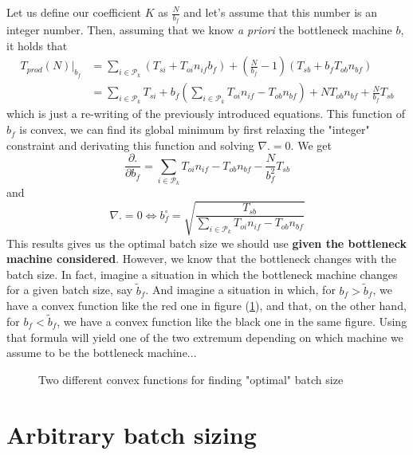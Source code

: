 Let us define our coefficient $K$ as $\frac{N}{b_f}$ and let's assume that this number is an integer number. Then, assuming that we know \textit{a priori} the bottleneck machine $b$, it holds that \[ \begin{split}
    T_{prod}(N)|_{b_f} &= \sum_{i\in\mathcal P_k} ( T_{si} + T_{oi}n_{if}b_f ) + \left( \frac{N}{b_f} - 1 \right)(T_{sb} + b_fT_{ob}n_{bf})\\
    &= \sum_{i\in\mathcal P_k} T_{si} + b_f\left( \sum_{i\in\mathcal P_k} T_{oi}n_{if} - T_{ob}n_{bf} \right) + NT_{ob}n_{bf} + \frac{N}{b_f}T_{sb}
    \end{split}
\] which is just a re-writing of the previously introduced equations. This function of $b_f$ is convex, we can find its global minimum by first relaxing the "integer" constraint and derivating this function and solving $\nabla . = 0$. We get
\[
    \frac{\partial .}{\partial b_f} = \sum_{i\in\mathcal P_k} T_{oi}n_{if} - T_{ob}n_{bf} - \frac{N}{b_f^2}T_{sb}
\] and \[
    \nabla . = 0 \Leftrightarrow b_f^\circ = \sqrt{ \frac{T_{sb}}{\sum_{i\in\mathcal P_k} T_{oi}n_{if} - T_{ob}n_{bf} } }
\]
This results gives us the optimal batch size we should use \textbf{given the bottleneck machine considered}. However, we know that the bottleneck changes with the batch size. In fact, imagine a situation in which the bottleneck machine changes for a given batch size, say $\tilde b_f$. And imagine a situation in which, for $b_f > \tilde b_f$, we have a convex function like the red one in figure (\ref{produced_i:convex}), and that, on the other hand, for $b_f < \tilde b_f$, we have a convex function like the black one in the same figure. Using that formula will yield one of the two extremum depending on which machine we assume to be the bottleneck machine...

\begin{figure}[h!]
    \centering
    \caption{\label{produced_i:convex}Two different convex functions for finding "optimal" batch size}
\end{figure}

\section{Arbitrary batch sizing}
